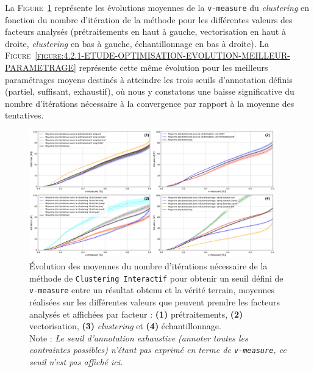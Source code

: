 		
			La \textsc{Figure~\ref{figure:4.2.1-ETUDE-OPTIMISATION-EVOLUTION-PAR-FACTEURS}} représente les évolutions moyennes de la \texttt{v-measure} du \textit{clustering} en fonction du nombre d'itération de la méthode pour les différentes valeurs des facteurs analysés (prétraitements en haut à gauche, vectorisation en haut à droite, \textit{clustering} en bas à gauche, échantillonnage en bas à droite).
			La \textsc{Figure~\ref{figure:4.2.1-ETUDE-OPTIMISATION-EVOLUTION-MEILLEUR-PARAMETRAGE}} représente cette même évolution pour les meilleurs paramétrages moyens destinés à atteindre les trois seuils d'annotation définis (partiel, suffisant, exhaustif), où nous y constatons une baisse significative du nombre d'itérations nécessaire à la convergence par rapport à la moyenne des tentatives.
			\begin{figure}[!htb]
				\centering
				\includegraphics[width=0.95\textwidth]{figures/etude-efficience-evolution-moyenne-par-vmeasure-par-facteur}
				\caption{Évolution des moyennes du nombre d'itérations nécessaire de la méthode de \texttt{Clustering Interactif} pour obtenir un seuil défini de \texttt{v-measure} entre un résultat obtenu et la vérité terrain, moyennes réalisées sur les différentes valeurs que peuvent prendre les facteurs analysés et affichées par facteur : \textbf{(1)} prétraitements, \textbf{(2)} vectorisation, \textbf{(3)} \textit{clustering} et \textbf{(4)} échantillonnage. \\
				Note : \textit{Le seuil d'annotation exhaustive (annoter toutes les contraintes possibles) n'étant pas exprimé en terme de \texttt{v-measure}, ce seuil n'est pas affiché ici.}}
				\label{figure:4.2.1-ETUDE-OPTIMISATION-EVOLUTION-PAR-FACTEURS}
			\end{figure}
